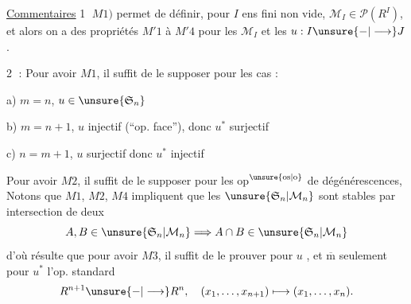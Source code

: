 \uline{Commentaires} \textcircled{1} $M1)$ permet de définir, pour  $I$ ens fini non vide, $\mathcal M_I\in\mathcal P(R^I)$, et alors on a des propriétés $M'1$ à $M'4$ pour les $\mathcal M_I$ et les $u:I\unsure{-|\longrightarrow}J$.

\textcircled{2} : Pour avoir $M1$, il suffit de le supposer pour les  cas :

a) $m=n$, $u\in\unsure{\mathfrak S_n}$

b) $m=n+1$, $u$ injectif (``op. face''), donc $u^*$ surjectif

c) $n=m+1$, $u$ surjectif   donc $u^*$ injectif



Pour avoir $M2$, il suffit de le supposer pour les op${}^{\unsure{\mathrm{os}|\mathrm{o}}}$ de dégénérescences, 
Notons que $M1$, $M2$, $M4$ impliquent que les $\unsure{\mathfrak S_n|\mathcal M_n}$ sont stables par intersection de deux
\[
A,B\in\unsure{\mathfrak S_n|\mathcal M_n}\Longrightarrow A\cap B\in\unsure{\mathfrak S_n|\mathcal M_n}
\]
d'où résulte que pour avoir $M3$, il suffit de le prouver pour $u$ , et $\overline{\mathrm m}$ seulement pour $u^*$ l'op. standard
\[
R^{n+1}\unsure{-|\longrightarrow}R^n,\quad(x_1,\ldots,x_{n+1})\longmapsto(x_1,\ldots,x_n).
\]

